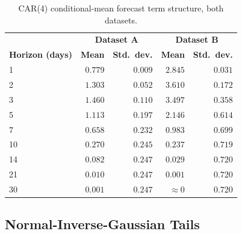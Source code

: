 \begin{table}[htbp]
\centering
\small
\caption{CAR(4) conditional-mean forecast term structure, both datasets.}
\label{tab:car4-forecast}
\begin{tabular}{l r r r r}
\toprule
& \multicolumn{2}{c}{\textbf{Dataset A}} & \multicolumn{2}{c}{\textbf{Dataset B}} \\
\textbf{Horizon (days)} & \textbf{Mean} & \textbf{Std.\ dev.} & \textbf{Mean} & \textbf{Std.\ dev.} \\
\midrule
1 & $0.779$ & $0.009$ & $2.845$ & $0.031$ \\
2 & $1.303$ & $0.052$ & $3.610$ & $0.172$ \\
3 & $1.460$ & $0.110$ & $3.497$ & $0.358$ \\
5 & $1.113$ & $0.197$ & $2.146$ & $0.614$ \\
7 & $0.658$ & $0.232$ & $0.983$ & $0.699$ \\
10 & $0.270$ & $0.245$ & $0.237$ & $0.719$ \\
14 & $0.082$ & $0.247$ & $0.029$ & $0.720$ \\
21 & $0.010$ & $0.247$ & $0.001$ & $0.720$ \\
30 & $0.001$ & $0.247$ & $\approx 0$ & $0.720$ \\
\bottomrule
\end{tabular}
\end{table}

\subsection{Normal-Inverse-Gaussian Tails}
\label{sec:phase4-nig}

